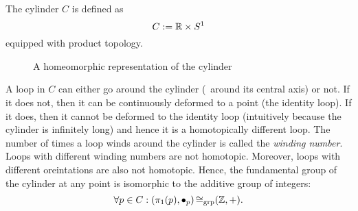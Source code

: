 \begin{example}
	The cylinder \(C\) is defined as
	\begin{equation}
		C := \mathbb R \times S^1 \label{eq:cylinder}
	\end{equation}
	equipped with product topology.
	\begin{figure}[H]
		\centering
		\caption{A homeomorphic representation of the cylinder}
		\label{fig:cylinder}
	\end{figure} \noindent
	A loop in $C$ can either go around the cylinder (\ie\ around its central axis) or not. If it does not, then it can be continuously deformed to a point (the identity loop). If it does, then it cannot be deformed to the identity loop (intuitively because the cylinder is infinitely long) and hence it is a homotopically different loop. The number of times a loop winds around the cylinder is called the \emph{winding number}. Loops with different winding numbers are not homotopic. Moreover, loops with different oreintations are also not homotopic. Hence, the fundamental group of the cylinder at any point is isomorphic to the additive group of integers:
	\begin{equation}
		\forall p \in C: \qty(\pi_1(p), \bullet_p) \operatorname{\cong_{\text{grp}}} (\mathbb Z, +). \label{eq:fundamental_group_cylinder}
	\end{equation}
\end{example}


